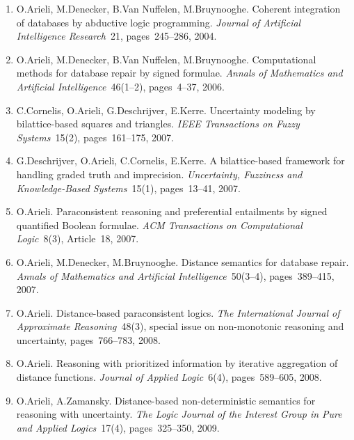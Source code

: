 \documentclass{article}
\begin{document}
\begin{enumerate}
    \item O.Arieli, M.Denecker, B.Van Nuffelen, M.Bruynooghe.
          Coherent integration of databases by abductive logic programming.
          {\em Journal of Artificial Intelligence Research\/}~21,
          pages~245--286, 2004.

    \item O.Arieli, M.Denecker, B.Van Nuffelen, M.Bruynooghe.
          Computational methods for database repair by signed formulae.
          {\em Annals of Mathematics and Artificial Intelligence\/}~46(1--2),
          pages~4--37, 2006.

    \item C.Cornelis, O.Arieli, G.Deschrijver, E.Kerre.
          Uncertainty modeling by bilattice-based squares and triangles.
          {\em IEEE Transactions on Fuzzy Systems\/}~15(2), pages~161--175, 2007.

    \item G.Deschrijver, O.Arieli, C.Cornelis, E.Kerre.
          A bilattice-based framework for handling graded truth and imprecision.
          {\em Uncertainty, Fuzziness and Knowledge-Based Systems\/}~15(1),
          pages~13--41, 2007.

    \item O.Arieli.
          Paraconsistent reasoning and preferential entailments by signed
          quantified Boolean formulae. {\em ACM Transactions on Computational Logic\/}~8(3),
          Article~18, 2007.

    \item O.Arieli, M.Denecker, M.Bruynooghe.
          Distance semantics for database repair.
          {\em Annals of Mathematics and Artificial Intelligence\/}~50(3--4),
          pages~389--415, 2007.

    \item O.Arieli.
          Distance-based paraconsistent logics.
          {\em The International Journal of Approximate Reasoning\/}~48(3), special
          issue on non-monotonic reasoning and uncertainty, pages~766--783, 2008.

    \item O.Arieli.
          Reasoning with prioritized information by iterative aggregation of
          distance functions. {\em Journal of Applied Logic\/}~6(4), pages~589--605, 2008.

    \item O.Arieli, A.Zamansky.
          Distance-based non-deterministic semantics for reasoning with uncertainty.
          {\em The Logic Journal of the Interest Group in Pure and Applied Logics\/}~17(4),
          pages~325--350, 2009.


\end{enumerate}
\end{document}
